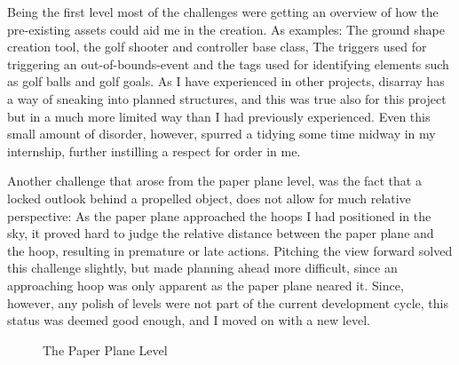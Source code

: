 Being the first level most of the challenges were getting an overview of how the pre-existing assets could aid me in the creation. As examples: The ground shape creation tool, the golf shooter and controller base class, The triggers used for triggering an out-of-bounds-event and the tags used for identifying elements such as golf balls and golf goals. As I have experienced in other projects, disarray has a way of sneaking into planned structures, and this was true also for this project but in a much more limited way than I had previously experienced. Even this small amount of disorder, however, spurred a tidying some time midway in my internship, further instilling a respect for order in me.

Another challenge that arose from the paper plane level, was the fact that a locked outlook behind a propelled object, does not allow for much relative perspective: As the paper plane approached the hoops I had positioned in the sky, it proved hard to judge the relative distance between the paper plane and the hoop, resulting in premature or late actions. Pitching the view forward solved this challenge slightly, but made planning ahead more difficult, since an approaching hoop was only apparent as the paper plane neared it. Since, however, any polish of levels were not part of the current development cycle, this status was deemed good enough, and I moved on with a new level.
\begin{center}
  \begin{figure}[!htb]
    \noindent{}
    \caption{The Paper Plane Level}
    \label{PaperPlane}
  \end{figure}
\end{center}
